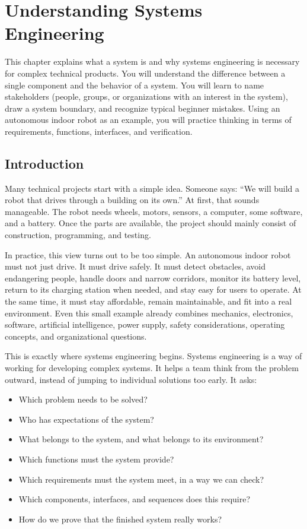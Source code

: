 \chapter{Understanding Systems Engineering}

\begin{lernziele}
This chapter explains what a system is and why systems engineering is necessary for complex technical products. You will understand the difference between a single component and the behavior of a system. You will learn to name stakeholders (people, groups, or organizations with an interest in the system), draw a system boundary, and recognize typical beginner mistakes. Using an autonomous indoor robot as an example, you will practice thinking in terms of requirements, functions, interfaces, and verification.
\end{lernziele}

\section{Introduction}
Many technical projects start with a simple idea. Someone says: \enquote{We will build a robot that drives through a building on its own.} At first, that sounds manageable. The robot needs wheels, motors, sensors, a computer, some software, and a battery. Once the parts are available, the project should mainly consist of construction, programming, and testing.

In practice, this view turns out to be too simple. An autonomous indoor robot must not just drive. It must drive safely. It must detect obstacles, avoid endangering people, handle doors and narrow corridors, monitor its battery level, return to its charging station when needed, and stay easy for users to operate. At the same time, it must stay affordable, remain maintainable, and fit into a real environment. Even this small example already combines mechanics, electronics, software, artificial intelligence, power supply, safety considerations, operating concepts, and organizational questions.

This is exactly where systems engineering begins. Systems engineering is a way of working for developing complex systems. It helps a team think from the problem outward, instead of jumping to individual solutions too early. It asks:

\begin{itemize}
    \item Which problem needs to be solved?
    \item Who has expectations of the system?
    \item What belongs to the system, and what belongs to its environment?
    \item Which functions must the system provide?
    \item Which requirements must the system meet, in a way we can check?
    \item Which components, interfaces, and sequences does this require?
    \item How do we prove that the finished system really works?
\end{itemize}

